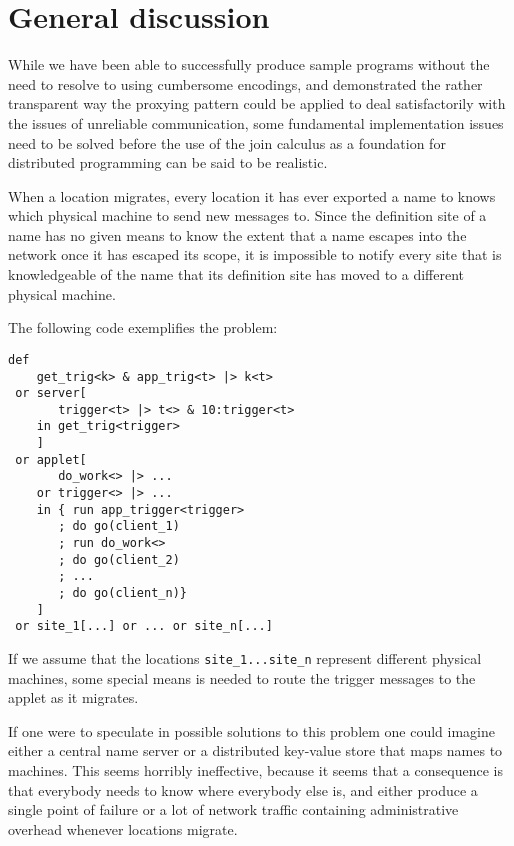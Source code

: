 
\section{General discussion}

While we have been able to successfully produce sample programs without the need
to resolve to using cumbersome encodings, and demonstrated the rather
transparent way the proxying pattern could be applied to deal satisfactorily
with the issues of unreliable communication, some fundamental implementation
issues need to be solved before the use of the join calculus as a foundation for
distributed programming can be said to be realistic.

When a location migrates, every location it has ever exported a name to knows
which physical machine to send new messages to.  Since the definition site of a
name has no given means to know the extent that a name escapes into the network
once it has escaped its scope, it is impossible to notify every site that is
knowledgeable of the name that its definition site has moved to a different
physical machine.

The following code exemplifies the problem:
\begin{verbatim}
def
    get_trig<k> & app_trig<t> |> k<t>
 or server[
       trigger<t> |> t<> & 10:trigger<t>
    in get_trig<trigger>
    ]
 or applet[
       do_work<> |> ...
    or trigger<> |> ...
    in { run app_trigger<trigger>
       ; do go(client_1)
       ; run do_work<>
       ; do go(client_2)
       ; ...
       ; do go(client_n)}
    ]
 or site_1[...] or ... or site_n[...]
\end{verbatim}

If we assume that the locations \verb+site_1...site_n+ represent different
physical machines, some special means is needed to route the trigger messages to
the applet as it migrates.

\vspace{1em}

If one were to speculate in possible solutions to this problem one could imagine
either a central name server or a distributed key-value store that maps names to
machines. This seems horribly ineffective, because it seems that a consequence
is that everybody needs to know where everybody else is, and either produce a
single point of failure or a lot of network traffic containing administrative
overhead whenever locations migrate.

